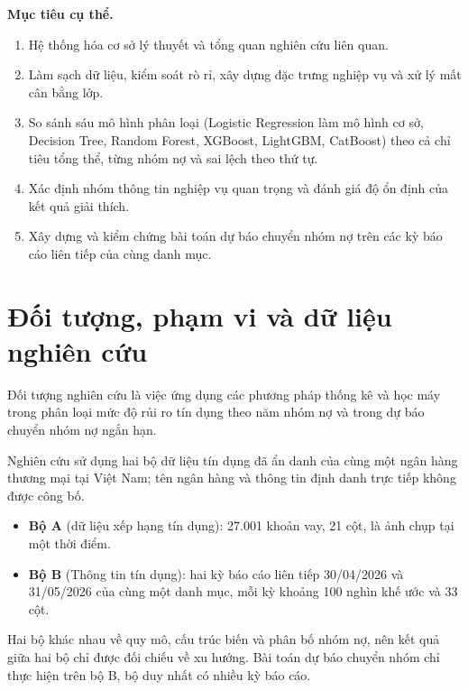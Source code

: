 \medskip
\noindent\textbf{Mục tiêu cụ thể.}
\begin{enumerate}
    \item Hệ thống hóa cơ sở lý thuyết và tổng quan nghiên cứu liên quan.
    \item Làm sạch dữ liệu, kiểm soát rò rỉ, xây dựng đặc trưng nghiệp vụ và xử lý mất cân bằng lớp.
    \item So sánh sáu mô hình phân loại (Logistic Regression làm mô hình cơ sở, Decision Tree, Random Forest, XGBoost, LightGBM, CatBoost) theo cả chỉ tiêu tổng thể, từng nhóm nợ và sai lệch theo thứ tự.
    \item Xác định nhóm thông tin nghiệp vụ quan trọng và đánh giá độ ổn định của kết quả giải thích.
    \item Xây dựng và kiểm chứng bài toán dự báo chuyển nhóm nợ trên các kỳ báo cáo liên tiếp của cùng danh mục.
\end{enumerate}

\medskip
\noindent{}

\section*{Đối tượng, phạm vi và dữ liệu nghiên cứu}

Đối tượng nghiên cứu là việc ứng dụng các phương pháp thống kê và học máy trong phân loại mức độ rủi ro tín dụng theo năm nhóm nợ và trong dự báo chuyển nhóm nợ ngắn hạn.

Nghiên cứu sử dụng hai bộ dữ liệu tín dụng đã ẩn danh của cùng một ngân hàng thương mại tại Việt Nam; tên ngân hàng và thông tin định danh trực tiếp không được công bố.
\begin{itemize}
    \item \textbf{Bộ A} (dữ liệu xếp hạng tín dụng): 27.001 khoản vay, 21 cột, là ảnh chụp tại một thời điểm.
    \item \textbf{Bộ B} (Thông tin tín dụng): hai kỳ báo cáo liên tiếp 30/04/2026 và 31/05/2026 của cùng một danh mục, mỗi kỳ khoảng 100 nghìn khế ước và 33 cột.
\end{itemize}
Hai bộ khác nhau về quy mô, cấu trúc biến và phân bố nhóm nợ, nên kết quả giữa hai bộ chỉ được đối chiếu về xu hướng. Bài toán dự báo chuyển nhóm chỉ thực hiện trên bộ B, bộ duy nhất có nhiều kỳ báo cáo.

